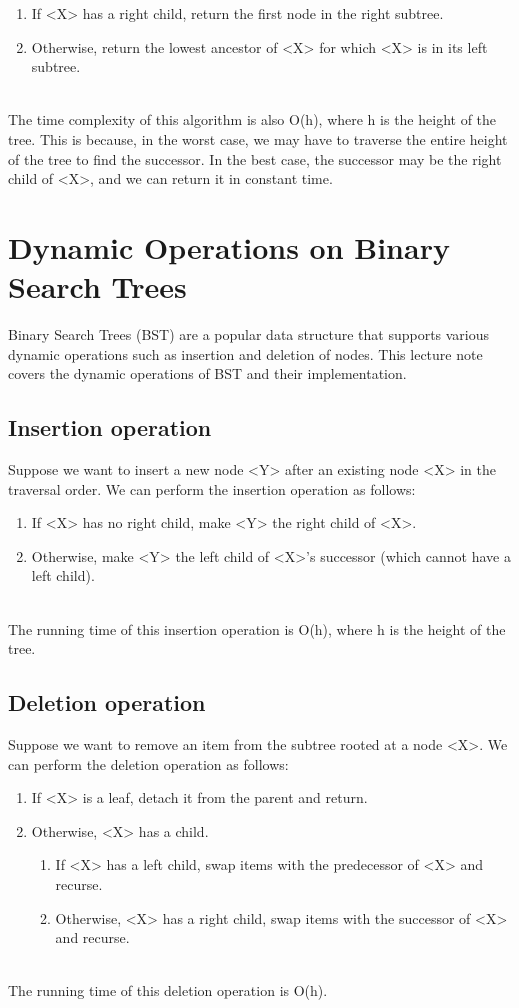 \documentclass[a4paper, 11pt, oneside]{book} %
\begin{document}
\begin{enumerate}
    \item If <X> has a right child, return the first node in the right subtree.
    \item Otherwise, return the lowest ancestor of <X> for which <X> is in its left subtree.
\end{enumerate}
\\

The time complexity of this algorithm is also O(h), where h is the height of the tree. This is because, in the worst case, we may have to traverse the entire height of the tree to find the successor. In the best case, the successor may be the right child of <X>, and we can return it in constant time.


\section{Dynamic Operations on Binary Search Trees}
Binary Search Trees (BST) are a popular data structure that supports various dynamic operations such as insertion and deletion of nodes. This lecture note covers the dynamic operations of BST and their implementation.

\subsection{Insertion operation}
Suppose we want to insert a new node <Y> after an existing node <X> in the traversal order. We can perform the insertion operation as follows:
\begin{enumerate}
    \item If <X> has no right child, make <Y> the right child of <X>.
    \item Otherwise, make <Y> the left child of <X>'s successor (which cannot have a left child).
\end{enumerate}
\\
The running time of this insertion operation is O(h), where h is the height of the tree.


\subsection{Deletion operation}
Suppose we want to remove an item from the subtree rooted at a node <X>. We can perform the deletion operation as follows:

\begin{enumerate}
    \item If <X> is a leaf, detach it from the parent and return.
    \item Otherwise, <X> has a child.
    \begin{enumerate}
        \item If <X> has a left child, swap items with the predecessor of <X> and recurse.
        \item Otherwise, <X> has a right child, swap items with the successor of <X> and recurse.
    \end{enumerate}
\end{enumerate}
\\
The running time of this deletion operation is O(h).
\end{document}

